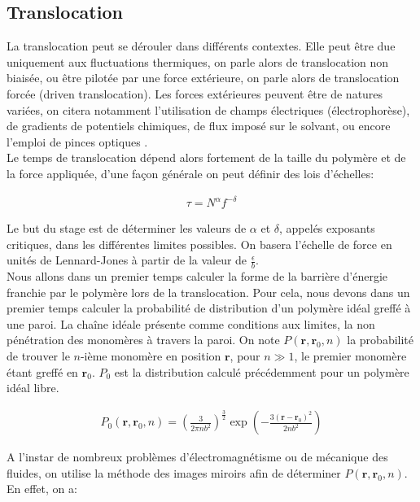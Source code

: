 \documentclass[a4paper,11pt]{article}
\begin{document}
\subsection{Translocation}



La translocation peut se dérouler dans différents contextes. Elle peut être due uniquement aux fluctuations thermiques, on parle alors de translocation non biaisée, ou être pilotée par une force extérieure, on parle alors de translocation forcée (driven translocation). Les forces extérieures peuvent être de natures variées, on citera notamment l'utilisation de champs électriques (électrophorèse), de gradients de potentiels chimiques, de flux imposé sur le solvant, ou encore l'emploi de pinces optiques \cite{keyser}.\\

Le temps de translocation dépend alors fortement de la taille du polymère et de la force appliquée, d'une façon générale on peut définir des lois d'échelles:

\begin{eqnarray}
\tau = N^\alpha f^{-\delta}
\label{tau}
\end{eqnarray}

 Le but du stage est de déterminer les valeurs de $\alpha$ et $\delta$, appelés exposants critiques, dans les différentes limites possibles. On basera l'échelle de force en unités de Lennard-Jones à partir de la valeur de $\frac{\epsilon}{b}$.\\

Nous allons dans un premier temps calculer la forme de la barrière d'énergie franchie par le polymère lors de la translocation. Pour cela, nous devons dans un premier temps calculer la probabilité de distribution d'un polymère idéal greffé à une paroi. La chaîne idéale présente comme conditions aux limites, la non pénétration des monomères à travers la paroi. On note $P(\textbf{r},\textbf{r}_0,n)$ la probabilité de trouver le $n$-ième monomère en position $\textbf{r}$, pour $n \gg 1$, le premier monomère étant greffé en $\textbf{r}_0$. $P_0$ est la distribution calculé précédemment pour un polymère idéal libre.

\begin{eqnarray}
P_0(\textbf{r},\textbf{r}_0,n)=\left(\frac{3}{2\pi n b^2}\right)^\frac{3}{2}\exp\left(-\frac{3(\textbf{r}-\textbf{r}_0)^2}{2 n b^2}\right)
\end{eqnarray}

A l'instar de nombreux problèmes d'électromagnétisme ou de mécanique des fluides, on utilise la méthode des images miroirs afin de déterminer $P(\textbf{r},\textbf{r}_0,n)$. En effet, on a:
\end{document}
